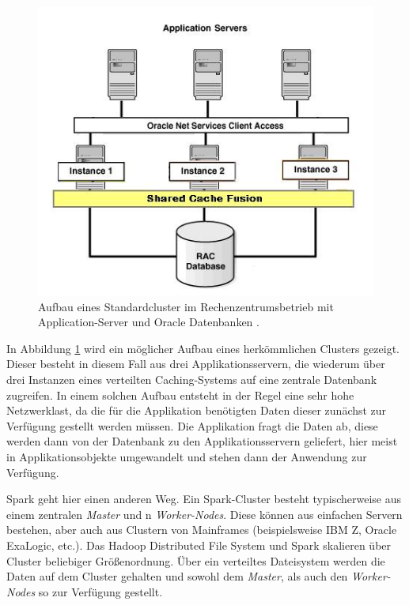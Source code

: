 \begin{figure}[htb!]
\centering
\includegraphics[width=1.0\textwidth]{bilder/oracle_cluster.jpg}
\caption{Aufbau eines Standardcluster im Rechenzentrumsbetrieb mit Application-Server und Oracle Datenbanken \protect{}. }
\label{fig:oracle}
\end{figure} 

In Abbildung \ref{fig:oracle} wird ein möglicher Aufbau eines herkömmlichen Clusters gezeigt. Dieser besteht in diesem Fall aus drei Applikationsservern, die wiederum über drei Instanzen eines verteilten Caching-Systems auf eine zentrale Datenbank zugreifen. In einem solchen Aufbau entsteht in der Regel eine sehr hohe Netzwerklast, da die für die Applikation benötigten Daten dieser zunächst zur Verfügung gestellt werden müssen. Die Applikation fragt die Daten ab, diese werden dann von der Datenbank zu den Applikationsservern geliefert, hier meist in Applikationsobjekte umgewandelt und stehen dann der Anwendung zur Verfügung. 

Spark geht hier einen anderen Weg. Ein Spark-Cluster besteht typischerweise aus einem zentralen \textit{Master} und n \textit{Worker-Nodes}. Diese können aus einfachen Servern bestehen, aber auch aus Clustern von Mainframes (beispielsweise IBM Z, Oracle ExaLogic, etc.). Das Hadoop Distributed File System und Spark skalieren über Cluster beliebiger Größenordnung. Über ein verteiltes Dateisystem werden die Daten auf dem Cluster gehalten und sowohl dem \textit{Master}, als auch den \textit{Worker-Nodes} so zur Verfügung gestellt. 

